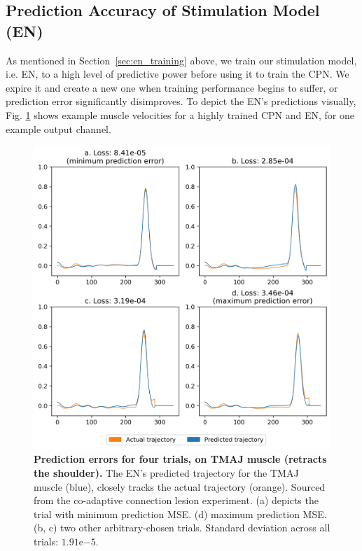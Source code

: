\documentclass[12pt]{iopart}
\begin{document}
\subsection{Prediction Accuracy of Stimulation Model (EN)}
\label{sup:pred_losses}

As mentioned in Section~\ref{sec:en_training} above, we train our stimulation model, i.e. EN, to a high
level of predictive power before using it to train the CPN. We expire it and create a new one when training
performance begins to suffer, or prediction error significantly disimproves. To depict the EN's predictions
visually, Fig. \ref{fig:pred_loss_examples} shows example muscle velocities for a highly trained CPN and EN,
for one example output channel.

\begin{figure}[h!]
\centering
\includegraphics[scale=0.8]{pred_loss_min_max.png}
\caption{\textbf{Prediction errors for four trials, on TMAJ muscle (retracts the shoulder).}
         The EN's predicted trajectory for the TMAJ muscle (blue), closely tracks the actual
         trajectory (orange). Sourced from the co-adaptive connection lesion experiment.
         (a) depicts the trial with minimum prediction MSE. (d) maximum prediction
         MSE. (b, c) two other arbitrary-chosen trials. Standard deviation across all trials:
         $1.91\mathrm{e}{-5}$.}
\label{fig:pred_loss_examples}
\end{figure}
\end{document}
